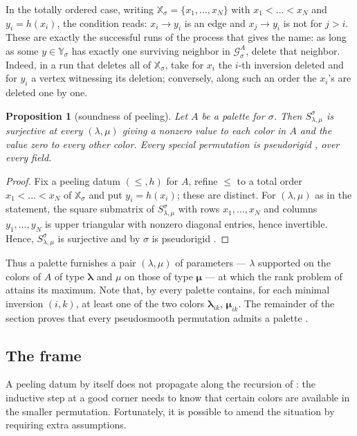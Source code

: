 \documentclass[12pt]{article}
\def\xspace{ }%
\newtheorem{proposition}[proposition]{Proposition}
\theoremstyle{definition}
\newcommand{\prig}{pseudorigid\xspace}
\newcommand{\psm}{pseudosmooth\xspace}
\newcommand{\good}{good\xspace}
\newcommand{\spc}{special\xspace}
\newcommand{\pal}{palette\xspace}      %
\newcommand{\pset}{A}                  %
\newcommand{\XX}{\mathbb{X}}  %
\newcommand{\YY}{\mathbb{Y}}  %
\newcommand{\Sop}{S}
\newcommand{\Gc}{\mathcal{G}}          %
\newcommand{\blam}{\boldsymbol{\lambda}}   %
\newcommand{\bmu}{\boldsymbol{\mu}}        %
\begin{document}
In the totally ordered case, writing $\XX_\sigma =
\{x_1,\dots,x_N\}$ with $x_1 < \dots < x_N$ and $y_i = h(x_i)$, the
condition reads: $x_i \to y_i$ is an edge and $x_j \to y_i$ is not for
$j > i$. These are exactly the successful runs of the process that gives
the name: as long as some $y \in \YY_\sigma$ has exactly one surviving
neighbor in $\Gc^\pset_\sigma$, delete that neighbor. Indeed, in a run that
deletes all of $\XX_\sigma$, take for $x_i$ the $i$-th inversion deleted
and for $y_i$ a vertex witnessing its deletion; conversely, along such an
order the $x_i$'s are deleted one by one.

\begin{proposition}[soundness of peeling]\label{prop:peel}
Let $\pset$ be a \pal for $\sigma$. Then $\Sop^\sigma_{\lambda,\mu}$
is surjective at every $(\lambda,\mu)$ giving a nonzero value to each color
in $\pset$ and the value zero to every other color. Every \spc permutation is
\prig, over every field.
\end{proposition}

\begin{proof}
Fix a peeling datum $(\le,h)$ for $\pset$, refine $\le$ to a total order
$x_1 < \dots < x_N$ of $\XX_\sigma$ and put $y_i = h(x_i)$; these are
distinct. For $(\lambda,\mu)$ as in the statement, the square submatrix of $\Sop^\sigma_{\lambda,\mu}$
with rows $x_1,\dots,x_N$ and columns $y_1,\dots,y_N$ is upper triangular with nonzero
diagonal entries, hence invertible. Hence, $\Sop^\sigma_{\lambda,\mu}$ is surjective and by  $\sigma$ is \prig.
\end{proof}



Thus a \pal furnishes a pair $(\lambda,\mu)$ of parameters
--- $\lambda$ supported on the colors of $\pset$ of type $\blam$ and $\mu$ on
those of type $\bmu$ --- at which the rank problem of 
attains its maximum. Note that, by  every \pal contains,
for each minimal inversion $(i,k)$, at least one of the two colors $\blam_{ik}$,
$\bmu_{ik}$. The remainder of the section proves that every \psm
permutation admits a \pal.

\subsection{The frame}\label{ssec:frame}

A peeling datum by itself does not propagate along the recursion of
: the inductive step at a \good corner needs to know that
certain colors are available in the smaller permutation. Fortunately, it is
possible to amend the situation by requiring extra assumptions.
\end{document}
